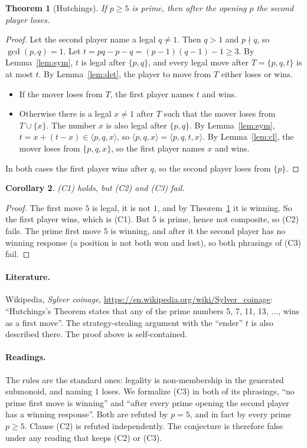 \documentclass[11pt]{article}
\newtheorem{theorem}{Theorem}
\newtheorem{corollary}[theorem]{Corollary}
\theoremstyle{definition}
\theoremstyle{remark}
\renewcommand{\_}{\oldus\allowbreak}
\begin{document}
\begin{theorem}[Hutchings]\label{thm:h}
If $p\ge 5$ is prime, then after the opening $p$ the second player loses.
\end{theorem}
\begin{proof}
Let the second player name a legal $q\ne 1$. Then $q>1$ and $p\nmid q$, so $\gcd(p,q)=1$. Let
$t=pq-p-q = (p-1)(q-1)-1 \ge 3$. By Lemma~\ref{lem:sym}, $t$ is legal after $\{p,q\}$, and every legal
move after $T=\{p,q,t\}$ is at most $t$. By Lemma~\ref{lem:det}, the player to move from $T$ either loses
or wins.
\begin{itemize}[nosep]
\item If the mover loses from $T$, the first player names $t$ and wins.
\item Otherwise there is a legal $x\ne1$ after $T$ such that the mover loses from $T\cup\{x\}$. The
number $x$ is also legal after $\{p,q\}$. By Lemma~\ref{lem:sym}, $t = x+(t-x) \in \langle p,q,x\rangle$,
so $\langle p,q,x\rangle = \langle p,q,t,x\rangle$. By Lemma~\ref{lem:cl}, the mover loses from
$\{p,q,x\}$, so the first player names $x$ and wins.
\end{itemize}
In both cases the first player wins after $q$, so the second player loses from $\{p\}$.
\end{proof}

\begin{corollary}
(C1) holds, but (C2) and (C3) fail.
\end{corollary}
\begin{proof}
The first move $5$ is legal, it is not $1$, and by Theorem~\ref{thm:h} it is winning. So the first
player wins, which is (C1). But $5$ is prime, hence not composite, so (C2) fails. The prime first move
$5$ is winning, and after it the second player has no winning response (a position is not both won and
lost), so both phrasings of (C3) fail.
\end{proof}

\paragraph{Literature.} Wikipedia, \emph{Sylver coinage},
\url{https://en.wikipedia.org/wiki/Sylver_coinage}: ``Hutchings's Theorem states that any of the prime
numbers 5, 7, 11, 13, ..., wins as a first move''. The strategy-stealing argument with the ``ender''
$t$ is also described there. The proof above is self-contained.

\paragraph{Readings.} The rules are the standard ones: legality is non-membership in the generated
submonoid, and naming $1$ loses. We formalize (C3) in both of its phrasings, ``no prime first move is
winning'' and ``after every prime opening the second player has a winning response''. Both are refuted
by $p=5$, and in fact by every prime $p\ge5$. Clause (C2) is refuted independently. The conjecture is
therefore false under any reading that keeps (C2) or (C3).
\end{document}
